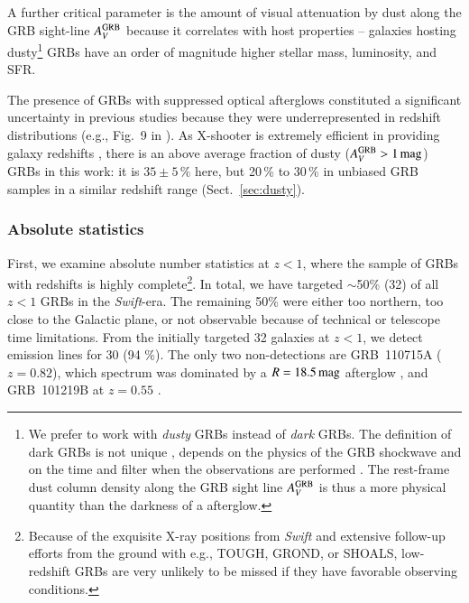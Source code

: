 \documentclass[traditabstract, longauth]{aa}
\begin{document}
A further critical parameter is the amount of visual attenuation by dust along the GRB sight-line $A^{\rm{GRB}}_V$ \citep{2011A&A...534A.108K, 2012ApJ...756..187H, 2013ApJ...778..128P, 2015ApJ...801..102P} because it correlates with host properties -- galaxies hosting dusty\footnote{We prefer to work with \textit{dusty} GRBs instead of \textit{dark} GRBs. The definition of dark GRBs is not unique \citep{2004ApJ...617L..21J, 2009ApJ...699.1087V}, depends on the physics of the GRB shockwave and on the time and filter when the observations are performed \citep{2011A&A...526A..30G}. The rest-frame dust column density along the GRB sight line  $A^{\rm{GRB}}_V$ is thus a more physical quantity than the darkness of a afterglow.} GRBs have an order of magnitude higher stellar mass, luminosity, and SFR. 

The presence of GRBs with suppressed optical afterglows \citep[e.g.,][]{1998ApJ...493L..27G, 2006ApJ...647..471L} constituted a significant uncertainty in previous studies because they were underrepresented in redshift distributions (e.g., Fig.~9 in \citealp{2012ApJ...756..187H}). As X-shooter is extremely efficient in providing galaxy redshifts \citep{2012ApJ...758...46K}, there is an above average fraction of dusty ($A^{\rm{GRB}}_V>1\,\rm{mag}$) GRBs in this work: it is $35\pm5\,\%$  here, but 20\,\% to 30\,\% in unbiased GRB samples \citep{2011A&A...526A..30G, 2012MNRAS.421.1265M, 2014arXiv1412.6530L} in a similar redshift range (Sect.~\ref{sec:dusty}).

\subsubsection{Absolute statistics}
\label{sec:absstat}

{First, we examine absolute number statistics at $z<1$, where the sample of GRBs with redshifts is highly complete\footnote{Because of the exquisite X-ray positions from \textit{Swift} and extensive follow-up efforts from the ground with e.g., TOUGH, GROND, or SHOALS, low-redshift GRBs are very unlikely to be missed if they have favorable observing conditions.}. In total, we have targeted $\sim$50\% (32) of all $z<1$ GRBs in the \textit{Swift}-era. The remaining 50\% were either too northern, too close to the Galactic plane, or not observable because of technical or telescope time limitations. From the initially targeted 32 galaxies at $z<1$, we detect emission lines for 30 (94 \%). The only two non-detections are GRB~110715A ($z=0.82$), which spectrum was dominated by a $R=18.5\,\rm{mag}$ afterglow \citep{2011GCN..12164...1P}, and GRB~101219B at $z=0.55$ \citep{2011ApJ...735L..24S}.}
\end{document}
